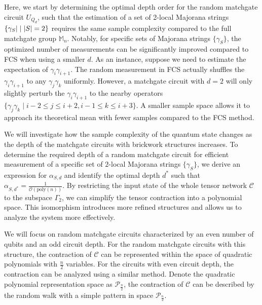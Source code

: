 \documentclass[journal=jctcce,a4paper,manuscript=article]{achemso}
\newcommand{\cbra}[1]{\{ #1 \}}
\newcommand{\Mbb}{\mathbb{M}}
\begin{document}
Here, we start by determining the optimal depth order for the random matchgate
circuit $U_{Q_d}$, such that the estimation of a set of 2-local Majorana
strings $\cbra{\gamma_S|\mid \abs{S}=2}$ requires the same sample complexity
compared to the full matchgate group $\Mbb_n$. Notably, for specific sets of
Majorana strings $\cbra{\gamma_S}$, the optimized number of measurements can be
significantly improved compared to FCS when using a smaller $d$. As an
instance, suppose we need to estimate the expectation of
$\gamma_{i}\gamma_{i+1}$. The random measurement in FCS actually shuffles the
$\gamma_{i}\gamma_{i+1}$ to any $\gamma_{j} \gamma_k$ uniformly. However, a
matchgate circuit with $d=2$ will only slightly perturb the
$\gamma_{i}\gamma_{i+1}$ to the nearby operators $\{\gamma_{j}\gamma_{k} \mid
  i-2\leq j \leq i+2, i-1\leq k \leq i+3\}$. A smaller sample space allows it to
approach its theoretical mean with fewer samples compared to the FCS method.

We will investigate how the sample complexity of the quantum state changes as
the depth of the matchgate circuits with brickwork structures increases. To
determine the required depth of a random matchgate circuit for efficient
measurement of a specific set of $2$-local Majorana strings $\cbra{\gamma_S}$,
we derive an expression for $\alpha_{S,d}$ and identify the optimal depth
$d^\ast$ such that $\alpha_{S,d^\ast} =
  \frac{1}{\mathcal{O}(\mathrm{poly}(n))}$. By restricting the input state of the
whole tensor network $\mathcal{C}$ to the subspace $\Gamma_2$, we can simplify
the tensor contraction into a polynomial space. This isomorphism introduces
more refined structures and allows us to analyze the system more effectively.

We will focus on random matchgate circuits characterized by an even number of
qubits and an odd circuit depth. For the random matchgate circuits with this
structure, the contraction of $\mathcal{C}$ can be represented within the space
of quadratic polynomials with $ \frac{n}{2} $ variables. For the circuits with
even circuit depth, the contraction can be analyzed using a similar method.
Denote the quadratic polynomial representation space as
$\mathcal{P}_{\frac{n}{2}}$, the contraction of $\mathcal{C}$ can be described
by the random walk with a simple pattern in space $\mathcal{P}_{\frac{n}{2}}$.
\end{document}
